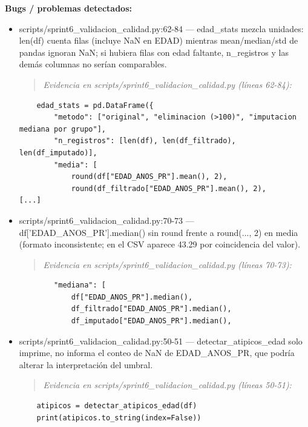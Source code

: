 \begin{tcolorbox}[riesgo]
\textbf{Bugs / problemas detectados:}
\begin{itemize}
  \item scripts/sprint6\_validacion\_calidad.py:62-84 --- edad\_stats mezcla unidades: len(df) cuenta filas (incluye NaN en EDAD) mientras mean/median/std de pandas ignoran NaN; si hubiera filas con edad faltante, n\_registros y las demás columnas no serían comparables.
\begin{quote}\footnotesize\ttfamily
\noindent\emph{Evidencia en scripts/sprint6\_validacion\_calidad.py (líneas 62-84):}
\end{quote}
\begin{lstlisting}
    edad_stats = pd.DataFrame({
        "metodo": ["original", "eliminacion (>100)", "imputacion mediana por grupo"],
        "n_registros": [len(df), len(df_filtrado), len(df_imputado)],
        "media": [
            round(df["EDAD_ANOS_PR"].mean(), 2),
            round(df_filtrado["EDAD_ANOS_PR"].mean(), 2),
[...]
\end{lstlisting}

  \item scripts/sprint6\_validacion\_calidad.py:70-73 --- df['EDAD\_ANOS\_PR'].median() sin round frente a round(..., 2) en media (formato inconsistente; en el CSV aparece 43.29 por coincidencia del valor).
\begin{quote}\footnotesize\ttfamily
\noindent\emph{Evidencia en scripts/sprint6\_validacion\_calidad.py (líneas 70-73):}
\end{quote}
\begin{lstlisting}
        "mediana": [
            df["EDAD_ANOS_PR"].median(),
            df_filtrado["EDAD_ANOS_PR"].median(),
            df_imputado["EDAD_ANOS_PR"].median(),
\end{lstlisting}

  \item scripts/sprint6\_validacion\_calidad.py:50-51 --- detectar\_atipicos\_edad solo imprime, no informa el conteo de NaN de EDAD\_ANOS\_PR, que podría alterar la interpretación del umbral.
\begin{quote}\footnotesize\ttfamily
\noindent\emph{Evidencia en scripts/sprint6\_validacion\_calidad.py (líneas 50-51):}
\end{quote}
\begin{lstlisting}
    atipicos = detectar_atipicos_edad(df)
    print(atipicos.to_string(index=False))
\end{lstlisting}

\end{itemize}
\end{tcolorbox}

